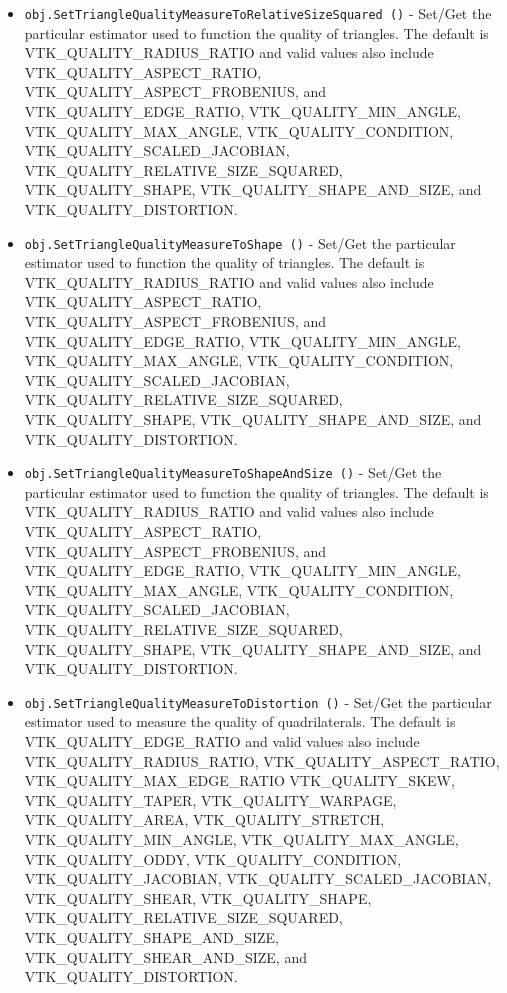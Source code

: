 \begin{itemize}
\item  \verb|obj.SetTriangleQualityMeasureToRelativeSizeSquared ()| -  Set/Get the particular estimator used to function the quality of triangles.
 The default is VTK\_QUALITY\_RADIUS\_RATIO and valid values also include
 VTK\_QUALITY\_ASPECT\_RATIO, VTK\_QUALITY\_ASPECT\_FROBENIUS, and VTK\_QUALITY\_EDGE\_RATIO,
 VTK\_QUALITY\_MIN\_ANGLE, VTK\_QUALITY\_MAX\_ANGLE, VTK\_QUALITY\_CONDITION,
 VTK\_QUALITY\_SCALED\_JACOBIAN, VTK\_QUALITY\_RELATIVE\_SIZE\_SQUARED,
 VTK\_QUALITY\_SHAPE, VTK\_QUALITY\_SHAPE\_AND\_SIZE, and VTK\_QUALITY\_DISTORTION.

\item  \verb|obj.SetTriangleQualityMeasureToShape ()| -  Set/Get the particular estimator used to function the quality of triangles.
 The default is VTK\_QUALITY\_RADIUS\_RATIO and valid values also include
 VTK\_QUALITY\_ASPECT\_RATIO, VTK\_QUALITY\_ASPECT\_FROBENIUS, and VTK\_QUALITY\_EDGE\_RATIO,
 VTK\_QUALITY\_MIN\_ANGLE, VTK\_QUALITY\_MAX\_ANGLE, VTK\_QUALITY\_CONDITION,
 VTK\_QUALITY\_SCALED\_JACOBIAN, VTK\_QUALITY\_RELATIVE\_SIZE\_SQUARED,
 VTK\_QUALITY\_SHAPE, VTK\_QUALITY\_SHAPE\_AND\_SIZE, and VTK\_QUALITY\_DISTORTION.

\item  \verb|obj.SetTriangleQualityMeasureToShapeAndSize ()| -  Set/Get the particular estimator used to function the quality of triangles.
 The default is VTK\_QUALITY\_RADIUS\_RATIO and valid values also include
 VTK\_QUALITY\_ASPECT\_RATIO, VTK\_QUALITY\_ASPECT\_FROBENIUS, and VTK\_QUALITY\_EDGE\_RATIO,
 VTK\_QUALITY\_MIN\_ANGLE, VTK\_QUALITY\_MAX\_ANGLE, VTK\_QUALITY\_CONDITION,
 VTK\_QUALITY\_SCALED\_JACOBIAN, VTK\_QUALITY\_RELATIVE\_SIZE\_SQUARED,
 VTK\_QUALITY\_SHAPE, VTK\_QUALITY\_SHAPE\_AND\_SIZE, and VTK\_QUALITY\_DISTORTION.

\item  \verb|obj.SetTriangleQualityMeasureToDistortion ()| -  Set/Get the particular estimator used to measure the quality of quadrilaterals.
 The default is VTK\_QUALITY\_EDGE\_RATIO and valid values also include
 VTK\_QUALITY\_RADIUS\_RATIO, VTK\_QUALITY\_ASPECT\_RATIO, VTK\_QUALITY\_MAX\_EDGE\_RATIO
 VTK\_QUALITY\_SKEW, VTK\_QUALITY\_TAPER, VTK\_QUALITY\_WARPAGE, VTK\_QUALITY\_AREA,
 VTK\_QUALITY\_STRETCH, VTK\_QUALITY\_MIN\_ANGLE, VTK\_QUALITY\_MAX\_ANGLE,
 VTK\_QUALITY\_ODDY, VTK\_QUALITY\_CONDITION, VTK\_QUALITY\_JACOBIAN,
 VTK\_QUALITY\_SCALED\_JACOBIAN, VTK\_QUALITY\_SHEAR, VTK\_QUALITY\_SHAPE,
 VTK\_QUALITY\_RELATIVE\_SIZE\_SQUARED, VTK\_QUALITY\_SHAPE\_AND\_SIZE,
 VTK\_QUALITY\_SHEAR\_AND\_SIZE, and VTK\_QUALITY\_DISTORTION.


\end{itemize}
